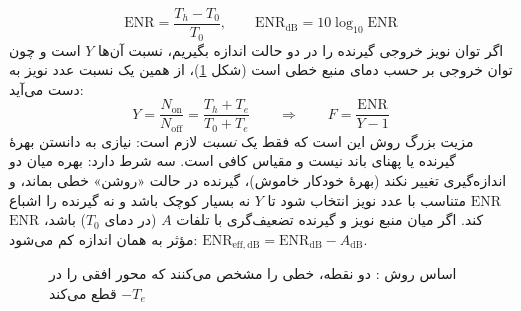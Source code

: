 \documentclass[a4paper,11pt]{article}
\begin{document}
\begin{equation}
	\mathrm{ENR} = \frac{T_h - T_0}{T_0}, \qquad \mathrm{ENR_{dB}} = 10\log_{10}\mathrm{ENR}
	\label{eq:enr}
\end{equation}
اگر توان نویز خروجی گیرنده را در دو حالت اندازه بگیریم، نسبت آن‌ها
$Y$
است و چون توان خروجی بر حسب دمای منبع خطی است (شکل
\ref{fig:yfactor})،
از همین یک نسبت عدد نویز به دست می‌آید:
\begin{equation}
	Y = \frac{N_{\mathrm{on}}}{N_{\mathrm{off}}} = \frac{T_h + T_e}{T_0 + T_e}
	\qquad\Longrightarrow\qquad
	F = \frac{\mathrm{ENR}}{Y - 1}
	\label{eq:yfactor}
\end{equation}
مزیت بزرگ روش این است که فقط یک \emph{نسبت} لازم است: نیازی به دانستن بهرهٔ گیرنده یا پهنای باند نیست و مقیاس
\dBFS{}
کافی است. سه شرط دارد: بهره میان دو اندازه‌گیری تغییر نکند (بهرهٔ خودکار خاموش)، گیرنده در حالت «روشن» خطی بماند، و
$\mathrm{ENR}$
متناسب با عدد نویز انتخاب شود تا
$Y$
نه بسیار کوچک باشد و نه گیرنده را اشباع کند. اگر میان منبع نویز و گیرنده تضعیف‌گری با تلفات
$A$
(در دمای
$T_0$)
باشد،
$\mathrm{ENR}$
مؤثر به همان اندازه کم می‌شود:
$\mathrm{ENR_{eff,dB}} = \mathrm{ENR_{dB}} - A_{\mathrm{dB}}$.

\begin{figure}[H]
	\centering
	\caption{اساس روش : دو نقطه، خطی را مشخص می‌کنند که محور افقی را در $-T_e$ قطع می‌کند}
	\label{fig:yfactor}
\end{figure}
\end{document}
